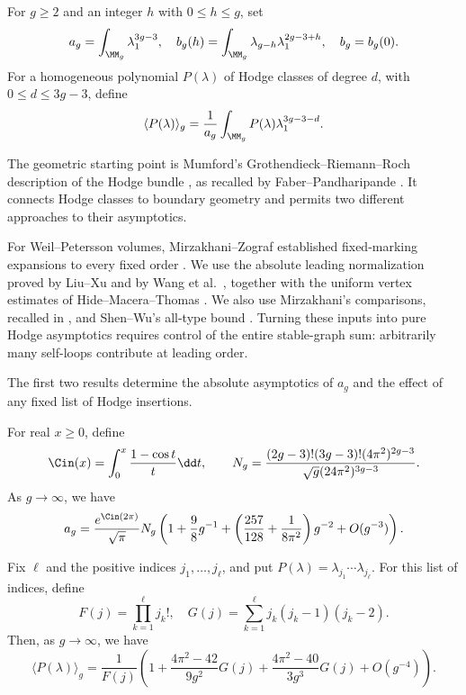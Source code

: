 For $g\geq2$ and an integer $h$ with $0\leq h\leq g$, set
\[a_g=\int_{\MM_g}\lambda_1^{3g-3},\quad b_g(h)=\int_{\MM_g}\lambda_{g-h} \lambda_1^{2g-3+h},
\quad b_g=b_g(0).\]
For a homogeneous polynomial $P(\lambda)$ of Hodge classes of degree
$d$, with $0\leq d\leq3g-3$, define
\[\langle P(\lambda) \rangle_g=\frac{1}{a_g}\int_{\MM_g} P(\lambda)\lambda_1^{3g-3-d}.\]

The geometric starting point is Mumford's
Grothendieck--Riemann--Roch description of the Hodge bundle
\cite[\S 5]{Mum83}, as recalled by
Faber--Pandharipande \cite[\S 1.1]{FP00}. It connects Hodge classes
to boundary geometry and permits two different approaches to
their asymptotics.

For Weil--Petersson volumes, Mirzakhani--Zograf established
fixed-marking expansions to every fixed order
\cite[Theorem 1.2]{MZ15}. We use the absolute leading normalization
proved by Liu--Xu \cite[Corollary 1.2]{LX26} and by Wang et al.\
\cite[Corollary 1.2]{W26}, together with the uniform vertex
estimates of Hide--Macera--Thomas \cite[Theorem 4.2]{HMT25}.
We also use Mirzakhani's comparisons, recalled in \cite[Lemma 14]{SW25},
and Shen--Wu's all-type bound \cite[Lemma 18]{SW25}.
Turning these inputs into pure Hodge asymptotics requires control
of the entire stable-graph sum: arbitrarily many self-loops
contribute at leading order.

The first two results determine the absolute asymptotics of $a_g$
and the effect of any fixed list of Hodge insertions.

\begin{thm}
\label{thm:lambda-one}
For real $x\geq0$, define
\[\Cin(x)=\int_0^x \frac{1-\cos t}{t}\dd t, \qquad
N_g=\frac{(2g-3)!(3g-3)!(4\pi^2)^{2g-3}}{\sqrt{g}(24\pi^2)^{3g-3}}.\]
As $g\to \infty$, we have
\begin{equation}
a_g=\frac{e^{\Cin(2\pi)}}{\sqrt{\pi}}N_g
\left(1+\frac{9}{8}g^{-1}+\left(\frac{257}{128}+\frac{1}{8\pi^2}\right)g^{-2}+O(g^{-3})\right).
\label{eq:111}
\end{equation}
\end{thm}

\begin{thm}
\label{thm:fixed-insertions}
Fix $\ell$ and the positive indices $j_1,\ldots,j_\ell$, and put
$P(\lambda)=\lambda_{j_1}\cdots\lambda_{j_\ell}$.  For this list of
indices, define
\[F(j)=\prod_{k=1}^\ell j_k!, \quad G(j)=\sum_{k=1}^\ell j_k(j_k-1)(j_k-2).\]
Then, as $g\to\infty$, we have
\begin{equation}
\langle P(\lambda) \rangle_g=\frac{1}{F(j)}\left(1+\frac{4\pi^2-42}{9g^2}G(j)+
\frac{4\pi^2-40}{3g^3}G(j)+O(g^{-4})\right).
\label{eq:P111}
\end{equation}
\end{thm}

